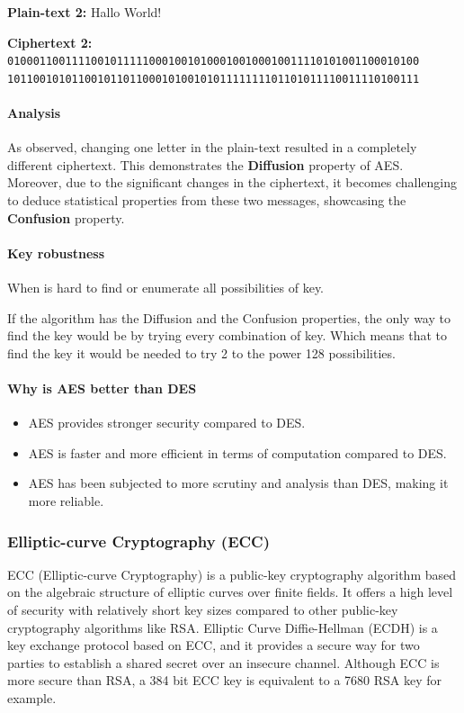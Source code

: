 \textbf{Plain-text 2:} Hallo World!

\textbf{Ciphertext 2:} \\
{\small\texttt{0100011001111001011111000100101000100100010011110101001100010100\\1011001010110010110110001010010101111111101101011110011110100111}}

\paragraph*{Analysis}

As observed, changing one letter in the plain-text resulted in a completely different ciphertext. This demonstrates the \textbf{Diffusion} property of AES. Moreover, due to the significant changes in the ciphertext, it becomes challenging to deduce statistical properties from these two messages, showcasing the \textbf{Confusion} property.

\paragraph{Key robustness} 
When is hard to find or enumerate all possibilities of key.

If the algorithm has the Diffusion and the Confusion properties, the only way to find the key would be by trying every combination of key. Which means that to find the key it would be needed to try 2 to the power 128 possibilities.

\paragraph{Why is AES better than DES}
\begin{itemize}
    \item AES provides stronger security compared to DES.
    \item AES is faster and more efficient in terms of computation compared to DES.
    \item AES has been subjected to more scrutiny and analysis than DES, making it more reliable.
\end{itemize}

\subsubsection{Elliptic-curve Cryptography (ECC)}
ECC (Elliptic-curve Cryptography) is a public-key cryptography algorithm based on the algebraic structure of elliptic curves over finite fields. It offers a high level of security with relatively short key sizes compared to other public-key cryptography algorithms like RSA. Elliptic Curve Diffie-Hellman (ECDH) is a key exchange protocol based on ECC, and it provides a secure way for two parties to establish a shared secret over an insecure channel. Although ECC is more secure than RSA, a 384 bit ECC key is equivalent to a 7680 RSA key for example.

